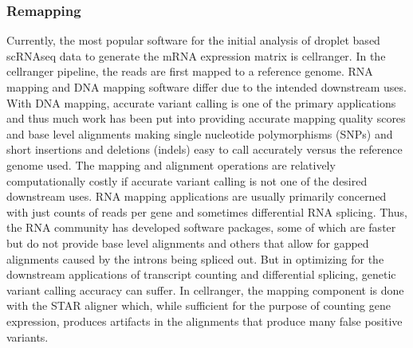 \subsubsection{Remapping}
\par{
Currently, the most popular software for the initial analysis of droplet based scRNAseq data to generate the mRNA expression matrix is cellranger\cite{10xsinglecell}. In the cellranger pipeline, the reads are first mapped to a reference genome. RNA mapping and DNA mapping software differ due to the intended downstream uses. With DNA mapping, accurate variant calling is one of the primary applications and thus much work has been put into providing accurate mapping quality scores and base level alignments making single nucleotide polymorphisms (SNPs) and short insertions and deletions (indels) easy to call accurately versus the reference genome used\cite{bwa}\cite{minimap2}\cite{bowtie}\cite{freebayes}\cite{gatk}. The mapping and alignment operations are relatively computationally costly if accurate variant calling is not one of the desired downstream uses. RNA mapping applications are usually primarily concerned with just counts of reads per gene and sometimes differential RNA splicing. Thus, the RNA community has developed software packages, some of which are faster but do not provide base level alignments\cite{kallisto}\cite{salmon} and others that allow for gapped alignments caused by the introns being spliced out\cite{bowtie2}\cite{STAR}\cite{hisat}\cite{tophat}. But in optimizing for the downstream applications of transcript counting and differential splicing, genetic variant calling accuracy can suffer. In cellranger, the mapping component is done with the STAR aligner\cite{STAR} which, while sufficient for the purpose 
of counting gene expression, produces artifacts in the alignments that produce many false positive variants. 
} 
